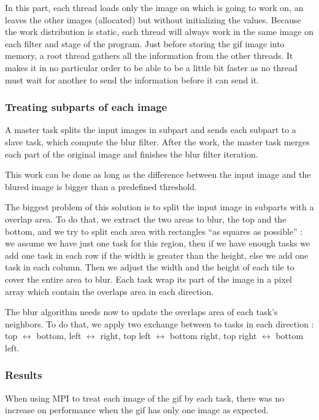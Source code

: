 \documentclass[conference,compsoc]{IEEEtran}
\begin{document}
In this part, each thread loads only the image on which is going to work on, an leaves the other images (allocated) but without initializing the values. Because the work distribution is static, each thread will always work in the same image on each filter and stage of the program.
Just before storing the gif image into memory, a root thread gathers all the information from the other threads. It makes it in no particular order to be able to be a little bit faster as no thread must wait for another to send the information before it can send it.

\subsubsection{Treating subparts of each image} \label{sec:treating_subparts}
A master task splits the input images in subpart and sends each subpart to a slave task, which compute the blur filter.
After the work, the master task merges each part of the original image and finishes the blur filter iteration.

This work can be done as long as the difference between the input image and the blured image is bigger than a predefined threshold.

The biggest problem of this solution is to split the input image in subparts with a overlap area. To do that, we extract the two areas to blur, the top and the bottom, and we try to split each area with rectangles ``as squares as possible'' : we assume we have just one task for this region, then if we have enough tasks we add one task in each row if the width is greater than the height, else we add one task in each column.
Then we adjust the width and the height of each tile to cover the entire area to blur. Each task wrap its part of the image in a pixel array which contain the overlaps area in each direction.

The blur algorithm needs now to update the overlaps area of each task's neighbors. To do that, we apply two exchange between to tasks in each direction : top $\leftrightarrow$ bottom, left $\leftrightarrow$ right, top left $\leftrightarrow$ bottom right, top right $\leftrightarrow$ bottom left.

\subsubsection{Results}
When using MPI to treat each image of the gif by each task, there was no increase on performance when the gif has only one image as expected. 
\end{document}
